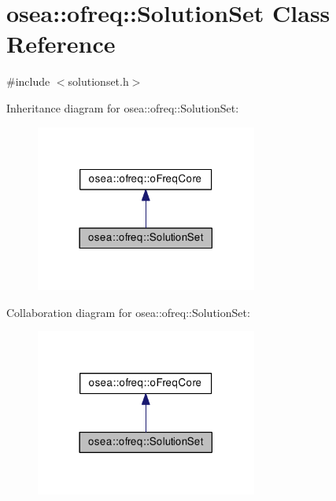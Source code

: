 \hypertarget{classosea_1_1ofreq_1_1_solution_set}{\section{osea\-:\-:ofreq\-:\-:Solution\-Set Class Reference}
\label{classosea_1_1ofreq_1_1_solution_set}
}


{\ttfamily \#include $<$solutionset.\-h$>$}



Inheritance diagram for osea\-:\-:ofreq\-:\-:Solution\-Set\-:\nopagebreak
\begin{figure}[H]
\begin{center}
\leavevmode
\includegraphics[width=206pt]{classosea_1_1ofreq_1_1_solution_set__inherit__graph}
\end{center}
\end{figure}


Collaboration diagram for osea\-:\-:ofreq\-:\-:Solution\-Set\-:\nopagebreak
\begin{figure}[H]
\begin{center}
\leavevmode
\includegraphics[width=206pt]{classosea_1_1ofreq_1_1_solution_set__coll__graph}
\end{center}
\end{figure}
